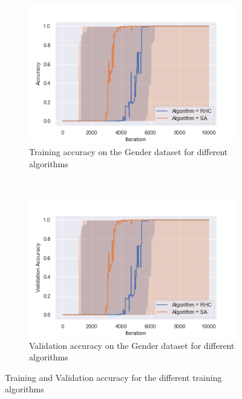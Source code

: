\documentclass[twocolumn, 10pt]{article}
\begin{document}
			\begin{figure}[h]
				\centering
				\begin{subfigure}[t]{0.45\columnwidth}
					\centering
					\includegraphics[width=\linewidth]{../graphics/g_all_Iteration_Error_Algorithm.png}
					\caption{Training accuracy on the Gender dataset for different algorithms}
					\label{g:all_test}
				\end{subfigure}
				~
				\begin{subfigure}[t]{0.45\columnwidth}
					\centering
					\includegraphics[width=1\linewidth]{../graphics/g_all_Iteration_Test_Error_Algorithm.png}
					\caption{Validation accuracy on the Gender dataset for different algorithms}
					\label{g:all_val}
				\end{subfigure}
				\caption{Training and Validation accuracy for the different training algorithms}
				\label{g:all}
			\end{figure}
\end{document}
